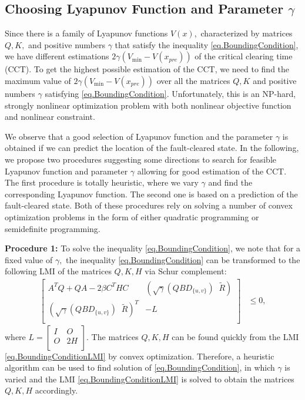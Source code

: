 \documentclass[final]{IEEEtran}
\begin{document}
\subsection{Choosing Lyapunov Function and
Parameter $\gamma$} Since there is a family of Lyapunov functions
$V(x),$ characterized by matrices $Q,K,$ and positive numbers
$\gamma$ that satisfy the inequality \eqref{eq.BoundingCondition},
we have different estimations $2\gamma (V_{\min}-V(x_{pre}))$ of
the critical clearing time (CCT). To get the highest possible
estimation of the CCT, we need to find the maximum value of
$2\gamma (V_{\min}-V(x_{pre}))$ over all the matrices $Q,K$ and
positive numbers $\gamma$ satisfying \eqref{eq.BoundingCondition}.
Unfortunately, this is an NP-hard, strongly nonlinear optimization
problem with both nonlinear objective function and nonlinear
constraint.

We observe that a good selection of Lyapunov function and the
parameter $\gamma$ is obtained if we can predict the location of
the fault-cleared state. In the following, we propose two
procedures  suggesting some directions to search for feasible
Lyapunov function and parameter $\gamma$ allowing for good
estimation of the CCT. The first procedure is totally heuristic,
where we vary $\gamma$ and find the corresponding Lyapunov
function. The second one is based on a prediction of the
fault-cleared state. Both of these procedures rely on solving a
number of convex optimization problems in the form of either
quadratic programming or semidefinite programming.

\textbf{Procedure 1:} To solve the inequality
\eqref{eq.BoundingCondition}, we note that for a fixed value of
$\gamma,$ the inequality \eqref{eq.BoundingCondition} can be
transformed to the following LMI of the matrices $Q,K,H$ via Schur
complement:
\begin{align}
\label{eq.BoundingConditionLMI}
    \left[   \begin{array}{ccccc}
          A^TQ+QA-2\beta C^THC   & (\sqrt{\gamma}(QBD_{\{u,v\}}) \;\; \tilde{R}) \\
          (\sqrt{\gamma}(QBD_{\{u,v\}}) \;\;\tilde{R})^T  & -L\\
        \end{array}\right] &\le 0,
  \end{align}
  where $L=\left[   \begin{array}{ccccc}
          I   & O \\
          O  & 2H\\
        \end{array}\right].$
The matrices $Q,K,H$ can be found quickly from the LMI
\eqref{eq.BoundingConditionLMI} by convex optimization. Therefore,
a heuristic algorithm can be used to find solution of
\eqref{eq.BoundingCondition}, in which $\gamma$ is varied and the
LMI \eqref{eq.BoundingConditionLMI} is solved to obtain the
matrices $Q,K,H$ accordingly.
\end{document}
